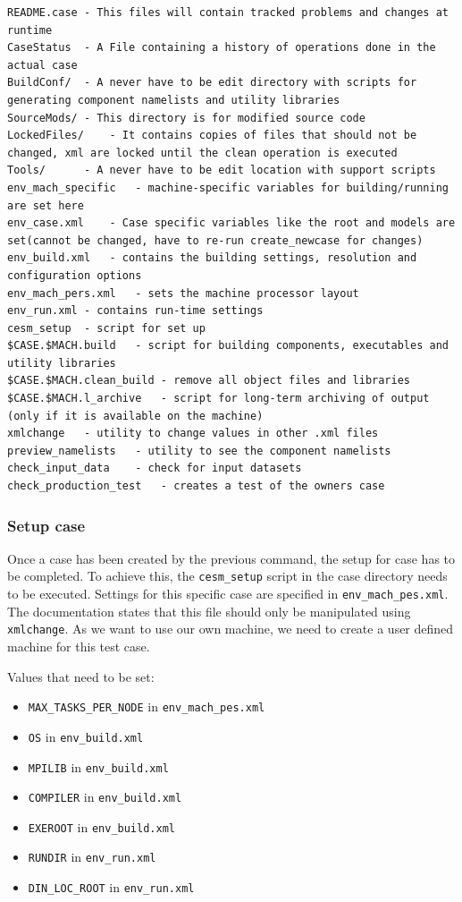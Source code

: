 \documentclass[]{article}
\providecommand{\tightlist}{%
  \setlength{\itemsep}{0pt}\setlength{\parskip}{0pt}}
\begin{document}
\begin{verbatim}
README.case - This files will contain tracked problems and changes at runtime
CaseStatus  - A File containing a history of operations done in the actual case
BuildConf/  - A never have to be edit directory with scripts for generating component namelists and utility libraries
SourceMods/ - This directory is for modified source code
LockedFiles/    - It contains copies of files that should not be changed, xml are locked until the clean operation is executed
Tools/      - A never have to be edit location with support scripts
env_mach_specific   - machine-specific variables for building/running are set here
env_case.xml    - Case specific variables like the root and models are set(cannot be changed, have to re-run create_newcase for changes)
env_build.xml   - contains the building settings, resolution and configuration options
env_mach_pers.xml   - sets the machine processor layout
env_run.xml - contains run-time settings
cesm_setup  - script for set up
$CASE.$MACH.build   - script for building components, executables and utility libraries
$CASE.$MACH.clean_build - remove all object files and libraries
$CASE.$MACH.l_archive   - script for long-term archiving of output (only if it is available on the machine)
xmlchange   - utility to change values in other .xml files
preview_namelists   - utility to see the component namelists
check_input_data    - check for input datasets
check_production_test   - creates a test of the owners case
\end{verbatim}

\subsubsection{Setup case}\label{setup-case}

Once a case has been created by the previous command, the setup for case
has to be completed. To achieve this, the \texttt{cesm\_setup} script in
the case directory needs to be executed. Settings for this specific case
are specified in \texttt{env\_mach\_pes.xml}. The documentation states
that this file should only be manipulated using \texttt{xmlchange}. As
we want to use our own machine, we need to create a user defined machine
for this test case.

Values that need to be set:

\begin{itemize}
\tightlist
\item
  \texttt{MAX\_TASKS\_PER\_NODE} in \texttt{env\_mach\_pes.xml}
\item
  \texttt{OS} in \texttt{env\_build.xml}
\item
  \texttt{MPILIB} in \texttt{env\_build.xml}
\item
  \texttt{COMPILER} in \texttt{env\_build.xml}
\item
  \texttt{EXEROOT} in \texttt{env\_build.xml}
\item
  \texttt{RUNDIR} in \texttt{env\_run.xml}
\item
  \texttt{DIN\_LOC\_ROOT} in \texttt{env\_run.xml}
\end{itemize}
\end{document}
